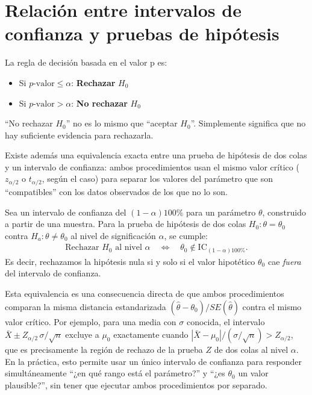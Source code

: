 \section{Relación entre intervalos de confianza y pruebas de hipótesis}
\label{sec:relacion-ic-pruebas}

La regla de decisión basada en el valor p es:

\begin{itemize}
	\item Si $p\text{-valor} \leq \alpha$: \textbf{Rechazar} $H_0$
	\item Si $p\text{-valor} > \alpha$: \textbf{No rechazar} $H_0$
\end{itemize}

\begin{observacion}
	``No rechazar $H_0$'' no es lo mismo que ``aceptar $H_0$''. Simplemente significa que no hay suficiente evidencia para rechazarla.
\end{observacion}

Existe además una equivalencia exacta entre una prueba de hipótesis de dos colas y un intervalo de confianza: ambos procedimientos usan el mismo valor crítico ($z_{\alpha/2}$ o $t_{\alpha/2}$, según el caso) para separar los valores del parámetro que son ``compatibles'' con los datos observados de los que no lo son.

\begin{teorema}
	Sea un intervalo de confianza del $(1-\alpha)100\%$ para un parámetro $\theta$, construido a partir de una muestra. Para la prueba de hipótesis de dos colas $H_0: \theta = \theta_0$ contra $H_a: \theta \neq \theta_0$ al nivel de significación $\alpha$, se cumple:
	\begin{align}
		\label{eq:6.2.1}
		\text{Rechazar } H_0 \text{ al nivel } \alpha \quad \Longleftrightarrow \quad \theta_0 \notin \text{IC}_{(1-\alpha)100\%}.
	\end{align}
	Es decir, rechazamos la hipótesis nula si y solo si el valor hipotético $\theta_0$ cae \emph{fuera} del intervalo de confianza.
\end{teorema}

\begin{observacion}
	Esta equivalencia es una consecuencia directa de que ambos procedimientos comparan la misma distancia estandarizada $(\hat{\theta}-\theta_0)/SE(\hat{\theta})$ contra el mismo valor crítico. Por ejemplo, para una media con $\sigma$ conocida, el intervalo $\bar{X} \pm Z_{\alpha/2}\,\sigma/\sqrt{n}$ excluye a $\mu_0$ exactamente cuando $|\bar{X}-\mu_0|/(\sigma/\sqrt{n}) > Z_{\alpha/2}$, que es precisamente la región de rechazo de la prueba $Z$ de dos colas al nivel $\alpha$. En la práctica, esto permite usar un único intervalo de confianza para responder simultáneamente ``¿en qué rango está el parámetro?'' y ``¿es $\theta_0$ un valor plausible?'', sin tener que ejecutar ambos procedimientos por separado.
\end{observacion}

